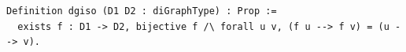 \begin{lstlisting}[language=Rocq]
Definition dgiso (D1 D2 : diGraphType) : Prop :=
  exists f : D1 -> D2, bijective f /\ forall u v, (f u --> f v) = (u --> v).
\end{lstlisting}
